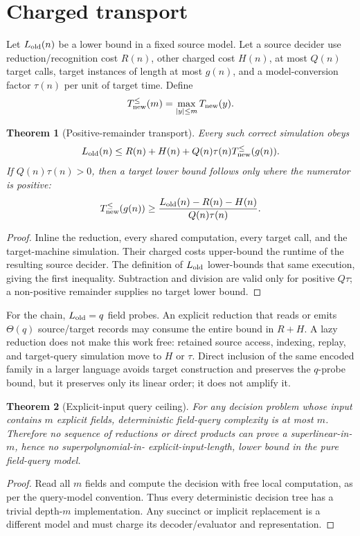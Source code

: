 \documentclass[11pt]{article}
\newtheorem{theorem}{Theorem}
\begin{document}
\section*{Charged transport}
Let $L_{\rm old}(n)$ be a lower bound in a fixed source model.  Let a source
decider use reduction/recognition cost $R(n)$, other charged cost $H(n)$, at
most $Q(n)$ target calls, target instances of length at most $g(n)$, and a
model-conversion factor $\tau(n)$ per unit of target time.  Define
\[
 T_{\rm new}^{\le}(m)=\max_{|y|\le m}T_{\rm new}(y).
\]

\begin{theorem}[Positive-remainder transport]\label{thm:transport}
Every such correct simulation obeys
\[
 L_{\rm old}(n)\le R(n)+H(n)+Q(n)\tau(n)
 T_{\rm new}^{\le}(g(n)).
\]
If $Q(n)\tau(n)>0$, then a target lower bound follows only where the numerator
is positive:
\[
 T_{\rm new}^{\le}(g(n))\ge
 \frac{L_{\rm old}(n)-R(n)-H(n)}{Q(n)\tau(n)}.
\]
\end{theorem}
\begin{proof}
Inline the reduction, every shared computation, every target call, and the
target-machine simulation.  Their charged costs upper-bound the runtime of the
resulting source decider.  The definition of $L_{\rm old}$ lower-bounds that
same execution, giving the first inequality.  Subtraction and division are
valid only for positive $Q\tau$; a non-positive remainder supplies no target
lower bound.
\end{proof}

For the chain, $L_{\rm old}=q$ field probes.  An explicit reduction that reads
or emits $\Theta(q)$ source/target records may consume the entire bound in
$R+H$.  A lazy reduction does not make this work free: retained source access,
indexing, replay, and target-query simulation move to $H$ or $\tau$.  Direct
inclusion of the same encoded family in a larger language avoids target
construction and preserves the $q$-probe bound, but it preserves only its
linear order; it does not amplify it.

\begin{theorem}[Explicit-input query ceiling]\label{thm:ceiling}
For any decision problem whose input contains $m$ explicit fields, deterministic
field-query complexity is at most $m$.  Therefore no sequence of reductions or
direct products can prove a superlinear-in-$m$, hence no superpolynomial-in-
explicit-input-length, lower bound in the pure field-query model.
\end{theorem}
\begin{proof}
Read all $m$ fields and compute the decision with free local computation, as
per the query-model convention.  Thus every deterministic decision tree has a
trivial depth-$m$ implementation.  Any succinct or implicit replacement is a
different model and must charge its decoder/evaluator and representation.
\end{proof}
\end{document}
